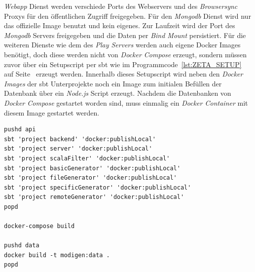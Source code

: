 \textit{Webapp} Dienst werden verschiede Ports des Webservers und des \textit{Browsersync} Proxys für den öffentlichen Zugriff freigegeben. Für den \textit{Mongodb} Dienst wird nur das offizielle Image benutzt und kein eigenes. Zur Laufzeit wird der Port des \textit{Mongodb} Servers freigegeben und die Daten per \textit{Bind Mount} persistiert. Für die weiteren Dienste wie dem des \textit{Play Servers} werden auch eigene Docker Images benötigt, doch diese werden nicht von \textit{Docker Compose} erzeugt, sondern müssen zuvor über ein Setupscript per \ac{sbt} wie im Programmcode~\ref{lst:ZETA_SETUP} auf Seite~\pageref{lst:ZETA_SETUP} erzeugt werden. Innerhalb dieses Setupscript wird neben den \textit{Docker Images} der \ac{sbt} Unterprojekte noch ein Image zum initialen Befüllen der Datenbank über ein \textit{Node.js} Script erzeugt. Nachdem die Datenbanken von \textit{Docker Compose} gestartet worden sind, muss einmalig ein \textit{Docker Container} mit diesem Image gestartet werden.

\bigskip
\begin{lstlisting}[caption={[Zeta Setupscript]Zeta Setupscript \cite{zeta_setupscript}},label={lst:ZETA_SETUP}]
pushd api
sbt 'project backend' 'docker:publishLocal'
sbt 'project server' 'docker:publishLocal'
sbt 'project scalaFilter' 'docker:publishLocal'
sbt 'project basicGenerator' 'docker:publishLocal'
sbt 'project fileGenerator' 'docker:publishLocal'
sbt 'project specificGenerator' 'docker:publishLocal'
sbt 'project remoteGenerator' 'docker:publishLocal'
popd

docker-compose build

pushd data
docker build -t modigen:data .
popd
\end{lstlisting}
\smallskip

